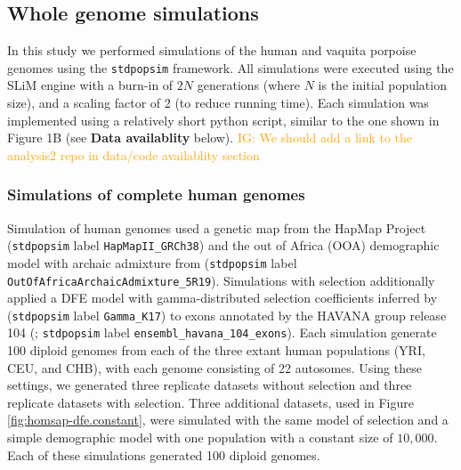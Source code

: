 \documentclass[hidelinks]{article}
\newcommand{\stdpopsim}{\texttt{stdpopsim}\xspace}
\newcommand{\igcomment}[1]{\textcolor{orange}{IG: #1}}
\begin{document}
    \subsection*{Whole genome simulations}
    In this study we performed simulations of the human and vaquita porpoise genomes
    using the \stdpopsim{} framework.
    All simulations were executed using the SLiM engine with a burn-in of $2N$ generations
    (where $N$ is the initial population size), and a scaling factor of 2 (to reduce running time).
    Each simulation was implemented using a relatively short python script, similar to the one shown in Figure 1B
    (see \textbf{Data availablity} below).
    \igcomment{We should add a link to the analysis2 repo in data/code availablity section}
   
    \subsubsection*{Simulations of complete human genomes}
    Simulation of human genomes used a genetic map from the HapMap Project
    \citep{international2007second} (\stdpopsim label \texttt{HapMapII\_GRCh38}) and
    the out of Africa (OOA) demographic model with archaic admixture from
    \cite{ragsdale2019models} (\stdpopsim label \texttt{OutOfAfricaArchaicAdmixture\_5R19}).
    Simulations with selection additionally applied a DFE model with gamma-distributed selection coefficients inferred by
    \cite{kim2017inference} (\stdpopsim label \texttt{Gamma\_K17}) to exons annotated by the HAVANA group release 104
    (\cite{ensembl2018}; \stdpopsim label \texttt{ensembl\_havana\_104\_exons}).
    Each simulation generate 100 diploid genomes from each of the three extant human populations (YRI, CEU, and CHB),
    with each genome consisting of 22 autosomes.
    Using these settings, we generated three replicate datasets without selection
    and three replicate datasets with selection.
    Three additional datasets, used in Figure \ref{fig:homsap-dfe.constant},
    were simulated with the same model of selection and a simple demographic model with one population with a constant size of $10,000$.
    Each of these simulations generated 100 diploid genomes.
    
\end{document}
